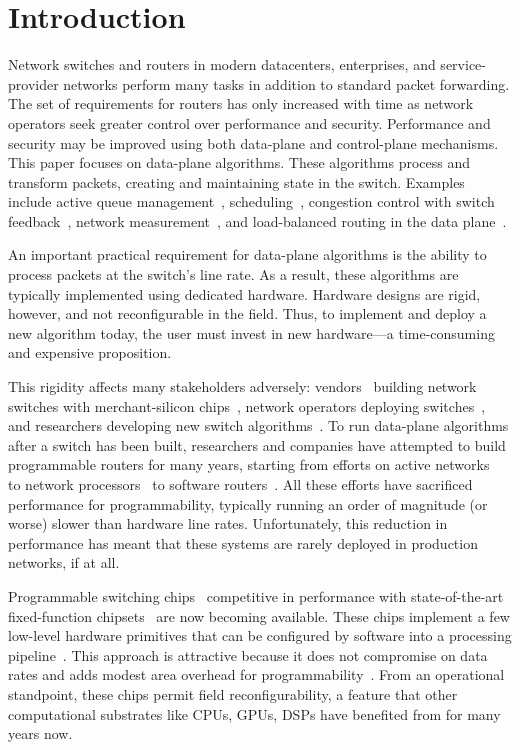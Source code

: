\section{Introduction}
\label{s:intro}

Network switches and routers in modern datacenters, enterprises, and
service-provider networks perform many tasks in addition to standard
packet forwarding. The set of requirements for routers has only
increased with time as network operators seek greater control over
performance and security.  Performance and security may be improved
using both data-plane and control-plane mechanisms. This paper focuses
on data-plane algorithms. These algorithms process and transform
packets, creating and maintaining state in the switch. Examples
include active queue management~\cite{red,blue,avq,codel,pie},
scheduling~\cite{pifo_hotnets}, congestion control with switch
feedback~\cite{xcp, rcp, pdq, dctcp}, network
measurement~\cite{opensketch, bitmap_george, elephant_george}, and
load-balanced routing in the data plane~\cite{conga}.

An important practical requirement for data-plane algorithms is the
ability to process packets at the switch's line rate.  As a result,
these algorithms are typically implemented using dedicated
hardware. Hardware designs are rigid, however, and not reconfigurable
in the field. Thus, to implement and deploy a new algorithm today, the
user must invest in new hardware---a time-consuming and expensive
proposition.

This rigidity affects many stakeholders adversely:
vendors~\cite{cisco_nexus, dell_force10, arista_7050} building network
switches with merchant-silicon chips~\cite{trident, tomahawk,
  mellanox}, network operators deploying
switches~\cite{google,facebook,vl2}, and researchers developing new
switch algorithms~\cite{xcp, codel, d3, detail, pdq}.  To run
data-plane algorithms after a switch has been built, researchers and
companies have attempted to build programmable routers for many years,
starting from efforts on active networks~\cite{active-nets} to network
processors~\cite{npu_survey} to software
routers~\cite{click,routebricks}. All these efforts have sacrificed
performance for programmability, typically running an order of
magnitude (or worse) slower than hardware line rates. Unfortunately,
this reduction in performance has meant that these systems are rarely
deployed in production networks, if at all.

Programmable switching chips~\cite{flexpipe, xpliant, rmt, corsa,
  uadp, algo_logic} competitive in performance with state-of-the-art
fixed-function chipsets~\cite{trident, tomahawk, mellanox} are now
becoming available. These chips implement a few low-level hardware
primitives that can be configured by software into a processing
pipeline~\cite{xpliant_sdk,xpliant_sdk2,intel_sdk}.  This approach is
attractive because it does not compromise on data rates and adds
modest area overhead for programmability~\cite{rmt}. From an
operational standpoint, these chips permit field reconfigurability, a
feature that other computational substrates like CPUs, GPUs,
DSPs have benefited from for many years now.

